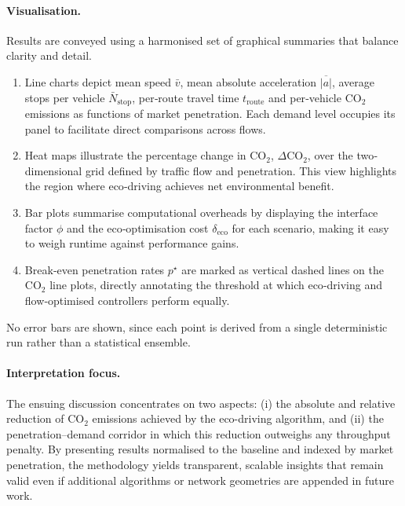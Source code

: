 \paragraph{Visualisation.}
Results are conveyed using a harmonised set of graphical summaries that balance clarity and detail. 
\begin{enumerate}[label=\textbf{(\alph*)},leftmargin=*]
    \item Line charts depict mean speed $\bar v$, mean absolute acceleration $\overline{|a|}$, average stops per vehicle $\bar N_{\mathrm{stop}}$, per‐route travel time $t_{\mathrm{route}}$ and per‐vehicle CO$_2$ emissions as functions of market penetration. Each demand level occupies its panel to facilitate direct comparisons across flows.
    \item Heat maps illustrate the percentage change in CO$_2$, $\Delta\mathrm{CO}_{2}$, over the two‐dimensional grid defined by traffic flow and penetration. This view highlights the region where eco‐driving achieves net environmental benefit.
    \item Bar plots summarise computational overheads by displaying the interface factor $\phi$ and the eco‐optimisation cost $\delta_{\mathrm{eco}}$ for each scenario, making it easy to weigh runtime against performance gains.
    \item Break‐even penetration rates $p^{\star}$ are marked as vertical dashed lines on the CO$_2$ line plots, directly annotating the threshold at which eco‐driving and flow‐optimised controllers perform equally.
\end{enumerate}
No error bars are shown, since each point is derived from a single deterministic run rather than a statistical ensemble.  

\paragraph{Interpretation focus.}
The ensuing discussion concentrates on two aspects: (i) the absolute and relative reduction of \(\mathrm{CO_{2}}\) emissions achieved by the eco-driving algorithm, and (ii) the penetration–demand corridor in which this reduction outweighs any throughput penalty. By presenting results normalised to the baseline and indexed by market penetration, the methodology yields transparent, scalable insights that remain valid even if additional algorithms or network geometries are appended in future work.